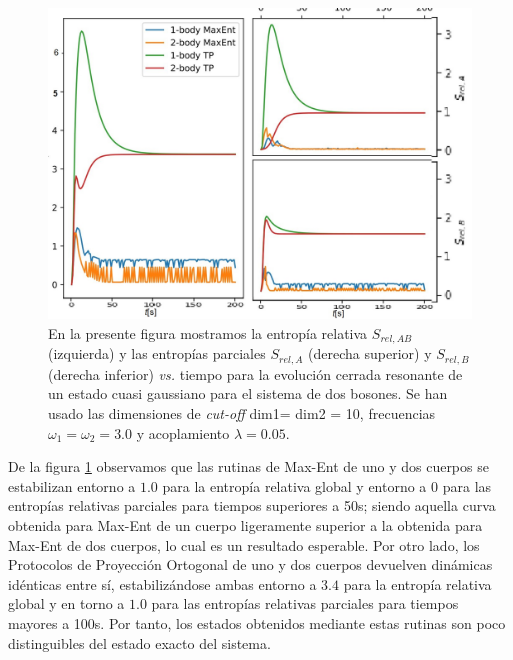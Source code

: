 \documentclass{report} %
\numberwithin{equation}{section}
\begin{document}
\begin{figure}
    \centering
    \includegraphics[scale=0.25]{figs/section3_4/section5_bxb-closed-res/rel_entropy_closed_res_g.jpg}
    \caption{En la presente figura mostramos la entropía relativa $S_{rel,AB}$ (izquierda) y las entropías parciales $S_{rel,A}$ (derecha superior) y $S_{rel,B}$ (derecha inferior) \textit{vs.} tiempo para la evolución cerrada resonante de un estado cuasi gaussiano para el sistema de dos bosones. Se han usado las dimensiones de \textit{cut-off} dim1= dim2 = 10, frecuencias $\omega_1 = \omega_2 = 3.0$ y acoplamiento $\lambda = 0.05$.}
    \label{rel_entropy_closed_res}
\end{figure}

De la figura \ref{rel_entropy_closed_res} observamos que las rutinas de Max-Ent de uno y dos cuerpos se estabilizan entorno a $1.0$ para la entropía relativa global y entorno a $0$ para las entropías relativas parciales para tiempos superiores a 50s; siendo aquella curva obtenida para Max-Ent de un cuerpo ligeramente superior a la obtenida para Max-Ent de dos cuerpos, lo cual es un resultado esperable. Por otro lado, los Protocolos de Proyección Ortogonal de uno y dos cuerpos devuelven dinámicas idénticas entre sí, estabilizándose ambas entorno a $3.4$ para la entropía relativa global y en torno a $1.0$ para las entropías relativas parciales para tiempos mayores a 100s. 
Por tanto, los estados obtenidos mediante estas rutinas son poco distinguibles del estado exacto del sistema. 
\end{document}
